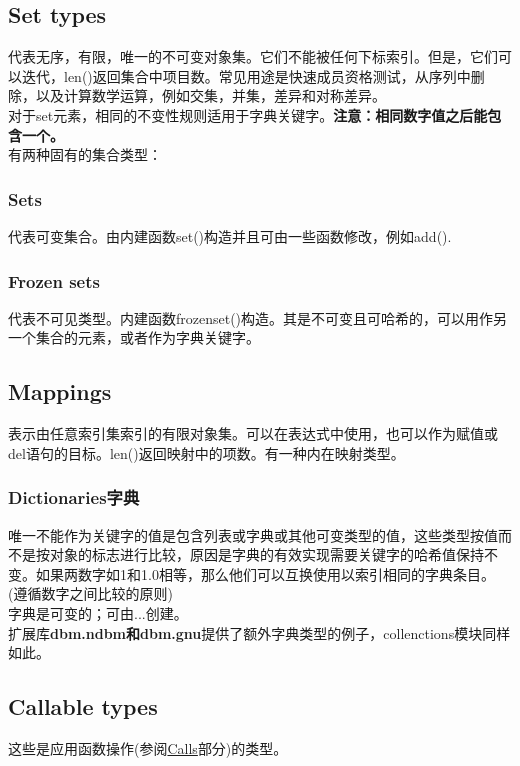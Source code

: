 \documentclass[10pt,UTF8]{ctexart}
\begin{document}
\begin{flushleft}
\subsection{Set types}
代表无序，有限，唯一的不可变对象集。它们不能被任何下标索引。但是，它们可以迭代，len()返回集合中项目数。常见用途是快速成员资格测试，从序列中删除，以及计算数学运算，例如交集，并集，差异和对称差异。\\
\indent 对于set元素，相同的不变性规则适用于字典关键字。\textbf{注意：相同数字值之后能包含一个。}\\
\indent 有两种固有的集合类型：
\subsubsection{Sets}
代表可变集合。由内建函数set()构造并且可由一些函数修改，例如add().
\subsubsection{Frozen sets}
代表不可见类型。内建函数frozenset()构造。其是不可变且可哈希的，可以用作另一个集合的元素，或者作为字典关键字。
\subsection{Mappings}
表示由任意索引集索引的有限对象集。可以在表达式中使用，也可以作为赋值或del语句的目标。len()返回映射中的项数。有一种内在映射类型。
\subsubsection{Dictionaries字典}
唯一不能作为关键字的值是包含列表或字典或其他可变类型的值，这些类型按值而不是按对象的标志进行比较，原因是字典的有效实现需要关键字的哈希值保持不变。如果两数字如1和1.0相等，那么他们可以互换使用以索引相同的字典条目。(遵循数字之间比较的原则)\\
\indent 字典是可变的；可由${...}$创建。\\
\indent 扩展库\textbf{dbm.ndbm和dbm.gnu}提供了额外字典类型的例子，collenctions模块同样如此。
\subsection{Callable types}
这些是应用函数操作(参阅\href{https://docs.python.org/3/reference/expressions.html#calls}{Calls}部分)的类型。

\end{flushleft}
\end{document}
